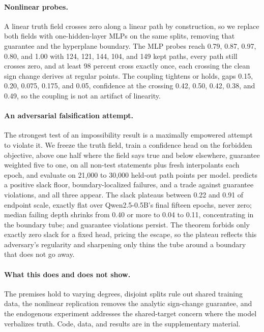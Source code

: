 \documentclass[mlmain,onecolumn]{jmlr}
\begin{document}
\paragraph{Nonlinear probes.}
A linear truth field crosses zero along a linear path by
construction, so we replace both fields with one-hidden-layer MLPs
on the same splits, removing that guarantee and the hyperplane
boundary. The MLP probes reach 0.79, 0.87, 0.97, 0.80, and 1.00
with 124, 121, 144, 104, and 149 kept paths, every path still
crosses zero, and at least 98 percent cross exactly once, each
crossing the clean sign change  derives
at regular points. The coupling tightens or holds, gaps 0.15, 0.20,
0.075, 0.175, and 0.05, confidence at the crossing 0.42, 0.50,
0.42, 0.38, and 0.49, so the coupling is not an artifact of
linearity.

\paragraph{An adversarial falsification attempt.}
The strongest test of an impossibility result is a maximally
empowered attempt to violate it. We freeze the truth field, train a
confidence head on the forbidden objective, above one half where
the field says true and below elsewhere, guarantee weighted five to
one, on all non-test statements plus fresh interpolants each epoch,
and evaluate on 21{,}000 to 30{,}000 held-out path points per
model.  predicts a positive slack floor,
boundary-localized failures, and a trade against guarantee
violations, and all three appear. The slack plateaus between 0.22
and 0.91 of endpoint scale, exactly flat over Qwen2.5-0.5B's final
fifteen epochs, never zero; median failing depth shrinks from 0.40
or more to 0.04 to 0.11, concentrating in the boundary tube; and
guarantee violations persist. The theorem forbids only exactly zero
slack for a fixed head,  pricing the escape,
so the plateau reflects this adversary's regularity and sharpening
only thins the tube around a boundary that does not go away.

\paragraph{What this does and does not show.}
The premises hold to varying degrees, disjoint splits rule out
shared training data, the nonlinear replication removes the
analytic sign-change guarantee, and the endogenous experiment
addresses the shared-target concern where the model verbalizes
truth. Code, data, and results are in the supplementary material.
\end{document}
